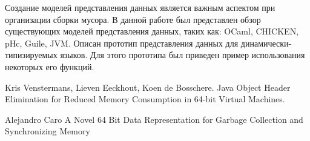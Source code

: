 Создание моделей представления данных является важным аспектом при организации сборки мусора. В данной работе был представлен
обзор существующих моделей представления данных, таких как: OCaml, CHICKEN, pHc, Guile, JVM. Описан прототип представления данных для динамически-типизируемых
языков. Для этого прототипа был приведен пример использования некоторых его функций.

\begin{thebibliography}{99}
Kris Venstermans, Lieven Eeckhout, Koen de Bosschere.
Java Object Header Elimination for Reduced Memory Consumption in 64-bit Virtual Machines.
\end{thebibliography}

\begin{thebibliography}{89}
Alejandro Caro
A Novel 64 Bit Data Representation for 
Garbage Collection and Synchronizing Memory
\end{thebibliography}
